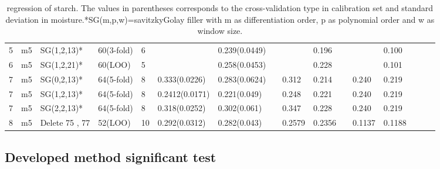 \documentclass[a4paper,12pt,titlepage]{article} %
\numberwithin{equation}{section}  %
\begin{document}
\begin{landscape}
\begin{table}[]
\begin{tabular}{llllllllllllllll}
				5                    & m5                   & SG(1,2,13)*           & 60(3-fold) & 6  &                & 0.239(0.0449) &   &        & 0.196  &   &        & 0.100          &         &    &               \\
				6                    & m5                   & SG(1,2,21)*           & 60(LOO)    & 5  &                & 0.258(0.0453) &   &        & 0.228  &   &        & 0.101          &         &    &               \\
				7                    & m5                   & SG(0,2,13)*           & 64(5-fold) & 8  & 0.333(0.0226)  & 0.283(0.0624) &   & 0.312  & 0.214  &   & 0.240  & 0.219          &         &    &               \\
				7                    & m5                   & SG(1,2,13)*           & 64(5-fold) & 8  & 0.2412(0.0171) & 0.221(0.049)  &   & 0.248  & 0.221  &   & 0.240  & 0.219          &         &    &               \\
				7                    & m5                   & SG(2,2,13)*           & 64(5-fold) & 8  & 0.318(0.0252)  & 0.302(0.061)  &   & 0.347  & 0.228  &   & 0.240  & 0.219          &         &    &               \\
				8                    & m5                   & Delete 75 , 77       & 52(LOO)    & 10 & 0.292(0.0312)  & 0.282(0.043)  &   & 0.2579 & 0.2356 &   & 0.1137 & 0.1188         &         &    &               
			\end{tabular}
			
			\caption{regression of starch. The values in parentheses corresponds to the cross-validation type in calibration set and standard deviation in moisture.*SG(m,p,w)=savitzkyGolay filler with m as differentiation order, p as polynomial order and w as window size.}
			\label{tab:starch}
		\end{table}
	\end{landscape}
	
	
	
	\subsection{Developed method significant test}
	\label{sec: test}
	
\end{document}

